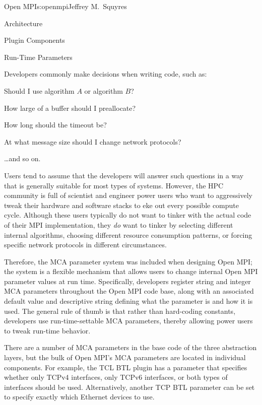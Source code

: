 \begin{aosachapter}{Open MPI}{s:openmpi}{Jeffrey M.\ Squyres}
\begin{aosasect1}{Architecture}
\begin{aosasect2}{Plugin Components}
\end{aosasect2}


\begin{aosasect2}{Run-Time Parameters}

Developers commonly make decisions when writing code, such as:

\begin{aosaitemize}
\item Should I use algorithm $A$ or algorithm $B$?
\item How large of a buffer should I preallocate?
\item How long should the timeout be?
\item At what message size should I change network protocols?
\item {\ldots}and so on.
\end{aosaitemize}

Users tend to assume that the developers will answer such questions in
a way that is generally suitable for most types of systems.
%
However, the HPC community is full of scientist and engineer power
users who want to aggressively tweak their hardware and software
stacks to eke out every possible compute cycle.
%
Although these users typically do not want to tinker with the actual
code of their MPI implementation, they \emph{do} want to tinker by
selecting different internal algorithms, choosing different resource
consumption patterns, or forcing specific network protocols in
different circumstances.

Therefore, the MCA parameter system was included when designing Open
MPI; the system is a flexible mechanism that allows users to change internal Open
MPI parameter values at run time.
%
Specifically, developers register string and integer MCA parameters
throughout the Open MPI code base, along with an associated default
value and descriptive string defining what the parameter is and how it
is used.
%
The general rule of thumb is that rather than hard-coding constants,
developers use run-time-settable MCA parameters, thereby allowing
power users to tweak run-time behavior.

There are a number of MCA parameters in the base code of the three
abstraction layers, but the bulk of Open MPI's MCA parameters are
located in individual components.
%
For example, the TCL BTL plugin has a parameter that specifies whether
only TCPv4 interfaces, only TCPv6 interfaces, or both types of
interfaces should be used.
%
Alternatively, another TCP BTL parameter can be set to specify
exactly which Ethernet devices to use.


\end{aosasect2}
\end{aosasect1}
\end{aosachapter}
